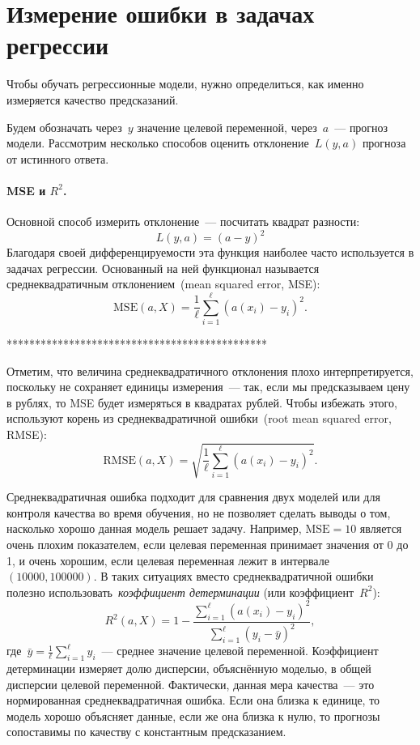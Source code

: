 \documentclass[12pt,fleqn]{article}
\begin{document}
\section{Измерение ошибки в задачах регрессии}

Чтобы обучать регрессионные модели, нужно определиться, как именно измеряется качество предсказаний.

Будем обозначать через~$y$ значение целевой переменной, через~$a$~--- прогноз модели.
Рассмотрим несколько способов оценить отклонение~$L(y, a)$ прогноза от истинного ответа. 


\paragraph{MSE и $R^2$.}

Основной способ измерить отклонение~--- посчитать квадрат разности:
$$
    L(y, a) = (a - y)^2
$$
Благодаря своей дифференцируемости эта функция наиболее часто используется в задачах регрессии.
Основанный на ней функционал называется среднеквадратичным отклонением~(mean squared error, MSE):
$$
    \text{MSE}(a, X)
    =
    \frac{1}{\ell}
    \sum_{i = 1}^{\ell} \left(
        a(x_i) - y_i
    \right)^2.
$$

\centerline{**********************************************}

Отметим, что величина среднеквадратичного отклонения плохо интерпретируется,
поскольку не сохраняет единицы измерения~--- так, если мы предсказываем цену
в рублях, то MSE будет измеряться в квадратах рублей.
Чтобы избежать этого, используют корень из среднеквадратичной ошибки~(root mean squared error, RMSE):
$$
    \text{RMSE}(a, X)
    =
    \sqrt{
        \frac{1}{\ell}
        \sum_{i = 1}^{\ell} \left(
            a(x_i) - y_i
        \right)^2
    }.
$$

Среднеквадратичная ошибка подходит для сравнения двух моделей
или для контроля качества во время обучения,
но не позволяет сделать выводы о том, насколько хорошо данная модель
решает задачу.
Например, $\text{MSE}=10$ является очень плохим показателем,
если целевая переменная принимает значения от 0 до 1,
и очень хорошим, если целевая переменная лежит в интервале~$(10000, 100000)$.
В таких ситуациях вместо среднеквадратичной ошибки полезно использовать~\emph{коэффициент детерминации}
(или коэффициент~$R^2$):
$$
    R^2(a, X)
    =
    1
    -
    \frac{
        \sum_{i = 1}^{\ell} (a(x_i) - y_i)^2
    }{
        \sum_{i = 1}^{\ell} (y_i - \bar y)^2
    },
$$
где~$\bar y = \frac{1}{\ell} \sum_{i = 1}^{\ell} y_i$~--- среднее значение целевой переменной.
Коэффициент детерминации измеряет долю дисперсии, объяснённую моделью, в общей дисперсии
целевой переменной.
Фактически, данная мера качества~--- это нормированная среднеквадратичная ошибка.
Если она близка к единице, то модель хорошо объясняет данные,
если же она близка к нулю, то прогнозы сопоставимы по качеству с константным предсказанием.
\end{document}
